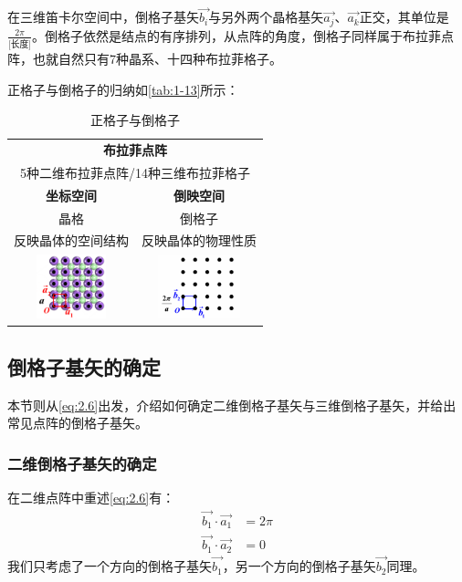     在三维笛卡尔空间中，倒格子基矢$\vec{b_i}$与另外两个晶格基矢$\vec{a_j}$、$\vec{a_k}$正交，其单位是$\frac{2\pi}{\mbox{[长度]}}$。倒格子依然是结点的有序排列，从点阵的角度，倒格子同样属于布拉菲点阵，也就自然只有7种晶系、十四种布拉菲格子。

    正格子与倒格子的归纳如\autoref{tab:1-13}所示：
    \begin{table}[!htbp]
        \centering
        \setlength{\tabcolsep}{1em}
        \begin{tabular}{cc}
            \toprule
            \multicolumn{2}{c}{\textbf{布拉菲点阵}}\\
            \multicolumn{2}{c}{5种二维布拉菲点阵/14种三维布拉菲格子}\\
            \midrule
            \textbf{坐标空间}           & \textbf{倒映空间}\\
            晶格                        & 倒格子\\
            反映晶体的空间结构           & 反映晶体的物理性质\\
            \midrule
            \includegraphics[valign=m, height=5em, keepaspectratio=true]{pic/2-02}&\includegraphics[valign=m, height=5em, keepaspectratio=true]{pic/2-03}\\
            \bottomrule
        \end{tabular}
        \caption{正格子与倒格子}
        \label{tab:1-13}
    \end{table}

\subsection{倒格子基矢的确定}
    本节则从\autoref{eq:2.6}出发，介绍如何确定二维倒格子基矢与三维倒格子基矢，并给出常见点阵的倒格子基矢。
\subsubsection{二维倒格子基矢的确定}
    在二维点阵中重述\autoref{eq:2.6}有：
    \begin{subequations}\label{eq:2.7}
    \begin{align}
        \vec{b_1} \cdot \vec{a_1} &= 2\pi\\
        \vec{b_1} \cdot \vec{a_2} &= 0
    \end{align}
    \end{subequations}
    我们只考虑了一个方向的倒格子基矢$\vec{b_1}$，另一个方向的倒格子基矢$\vec{b_2}$同理。

